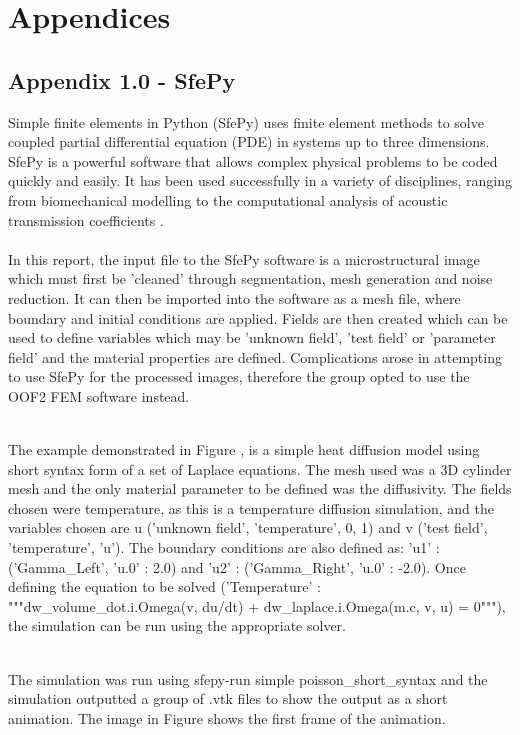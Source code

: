 \documentclass[\report.tex]{subfiles}
\begin{document}
\section{Appendices}

\subsection{Appendix 1.0 - SfePy}
Simple finite elements in Python (SfePy) uses finite element methods to solve coupled partial differential equation (PDE) in systems up to three dimensions. SfePy is a powerful software that allows complex physical problems to be coded quickly and easily. It has been used successfully in a variety of disciplines, ranging from biomechanical modelling \cite{biomedapplication} to the computational analysis of acoustic transmission coefficients \cite{AcousticTransmission}.\\ 

\\In this report, the input file to the SfePy software is a microstructural image which must first be 'cleaned' through segmentation, mesh generation and noise reduction. It can then be imported into the software as a mesh file, where boundary and initial conditions are applied. Fields are then created which can be used to define variables which may be 'unknown field', 'test field' or 'parameter field' \cite{FEMinSfePy} and the material properties are defined. Complications arose in attempting to use SfePy for the processed images, therefore the group opted to use the OOF2 FEM software instead.

\\The example demonstrated in Figure \cite{fig:sfepy_example}, is a simple heat diffusion model using short syntax form of a set of Laplace equations. The mesh used was a 3D cylinder mesh and the only material parameter to be defined was the diffusivity. The fields chosen were temperature, as this is a temperature diffusion simulation, and the variables chosen are u ('unknown field', 'temperature', 0, 1) and v ('test field',    'temperature', 'u'). The boundary conditions are also defined as: 'u1' : ('Gamma_Left', {'u.0' : 2.0}) and 'u2' : ('Gamma_Right', {'u.0' : -2.0}). Once defining the equation to be solved ('Temperature' : """dw_volume_dot.i.Omega(v, du/dt) + dw_laplace.i.Omega(m.c, v, u) = 0"""), the simulation can be run using the appropriate solver.

\\ The simulation was run using sfepy-run simple poisson_short_syntax and the simulation outputted a group of .vtk files to show the output as a short animation. The image in Figure \cite{fig:sfepy_example} shows the first frame of the animation.
\end{document}
